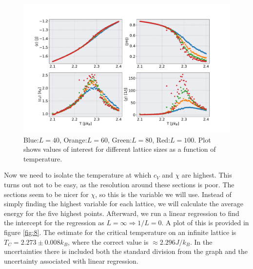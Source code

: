 \documentclass[english,notitlepage,reprint,nofootinbib]{revtex4-1}  %
\begin{document}
\begin{figure}[h!]
    \centering %
    \includegraphics[scale=0.23]{figures/8.pdf} %
    \caption{Blue:$L=40$, Orange:$L=60$, Green:$L=80$, Red:$L=100$. Plot shows values of interest for different lattice sizes as a function of temperature.}
    \label{fig:7}
\end{figure}


Now we need to isolate the temperature at which $c_V$ and $\chi$ are highest. This turns out not to be easy, as the resolution around these sections is poor. The sections seem to be nicer for $\chi$, so this is the variable we will use. Instead of simply finding the highest variable for each lattice, we will calculate the average energy for the five highest points. Afterward, we run a linear regression to find the intercept for the regression as $L=\infty \Rightarrow 1/L = 0$. A plot of this is provided in figure \ref{fig:8}. The estimate for the critical temperature on an infinite lattice is $T_C = 2.273 \pm 0.008 k_B$, where the correct value is $\approx 2.296 J/k_B$. In the uncertainties there is included both the standard division from the graph and the uncertainty associated with linear regression.
\end{document}
